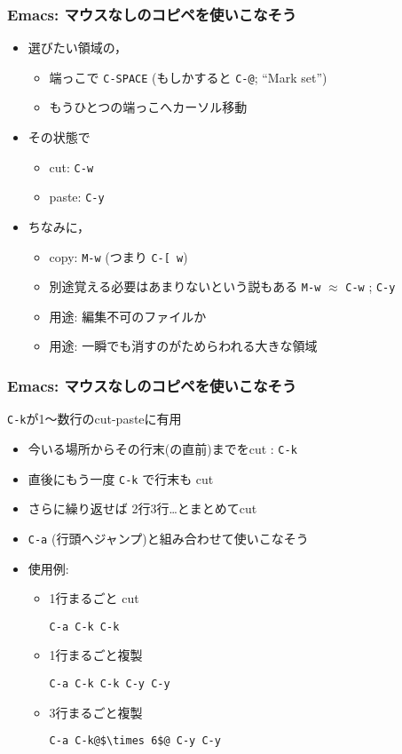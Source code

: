 \documentclass[12pt,dvipdfmx]{beamer}
\newcommand{\ao}[1]{{\color{blue}#1}}
\begin{document}
\begin{frame}
\frametitle{Emacs: マウスなしのコピペを使いこなそう}

\begin{itemize}
\item 選びたい領域の，
  \begin{itemize}
  \item 端っこで \texttt{\ao{C-SPACE}} (もしかすると \texttt{\ao{C-@}};
    ``Mark set'')
  \item もうひとつの端っこへカーソル移動
  \end{itemize}
\item その状態で
  \begin{itemize}
  \item cut: \texttt{\ao{C-w}}
  \item paste: \texttt{\ao{C-y}}
  \end{itemize}
\item ちなみに，
  \begin{itemize}
  \item copy: \texttt{\ao{M-w}} (つまり \texttt{\ao{C-[ w}})
  \item 別途覚える必要はあまりないという説もある
    \texttt{\ao{M-w}} $\approx$ \texttt{\ao{C-w}} ; \texttt{\ao{C-y}}
  \item 用途: 編集不可のファイルか
  \item 用途: 一瞬でも消すのがためらわれる大きな領域
  \end{itemize}
\end{itemize}
\end{frame}


\begin{frame}[fragile]
\frametitle{Emacs: マウスなしのコピペを使いこなそう}
\texttt{\ao{C-k}}が1〜数行のcut-pasteに有用 
\begin{itemize}
\item 今いる場所からその行末(の直前)までをcut : \texttt{\ao{C-k}}
\item 直後にもう一度 \texttt{\ao{C-k}} で行末も cut
\item さらに繰り返せば 2行3行\ldots とまとめてcut
\item \texttt{\ao{C-a}} (行頭へジャンプ)と組み合わせて使いこなそう
\item 使用例: 
  \begin{itemize}
  \item 1行まるごと cut 
\begin{lstlisting}
C-a C-k C-k
\end{lstlisting}
\item 1行まるごと複製
\begin{lstlisting}
C-a C-k C-k C-y C-y
\end{lstlisting}
\item 3行まるごと複製
\begin{lstlisting}
C-a C-k@$\times 6$@ C-y C-y
\end{lstlisting}
  \end{itemize}
\end{itemize}
\end{frame}
\end{document}
